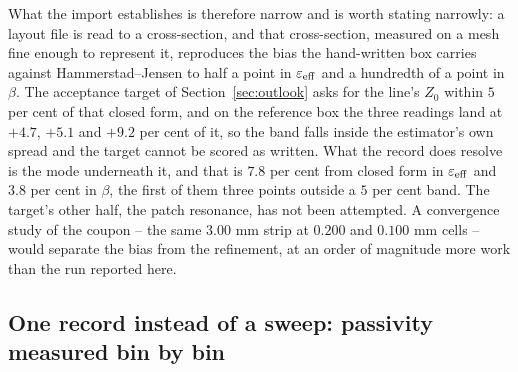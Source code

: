 What the import establishes is therefore narrow and is worth stating narrowly: a layout file is read to a
cross-section, and that cross-section, measured on a mesh fine enough to represent it, reproduces the bias the
hand-written box carries against Hammerstad--Jensen to half a point in $\varepsilon_{\mathrm{eff}}$ and a hundredth of a
point in $\beta$. The acceptance target of Section~\ref{sec:outlook} asks for the line's $Z_0$ within $5$ per cent
of that closed form, and on the reference box the three readings land at $+4.7$, $+5.1$ and $+9.2$ per cent of it,
so the band falls inside the estimator's own spread and the target cannot be scored as written. What the record
does resolve is the mode underneath it, and that is $7.8$ per cent from closed form in $\varepsilon_{\mathrm{eff}}$ and
$3.8$ per cent in $\beta$, the first of them three points outside a $5$ per cent band. The target's other half,
the patch resonance, has not been attempted. A convergence study of the coupon -- the same $3.00$ mm strip at
$0.200$ and $0.100$ mm cells -- would separate the bias from the refinement, at an order of magnitude more work
than the run reported here.

\subsection{One record instead of a sweep: passivity measured bin by bin}
\label{sec:msres-broadband}

